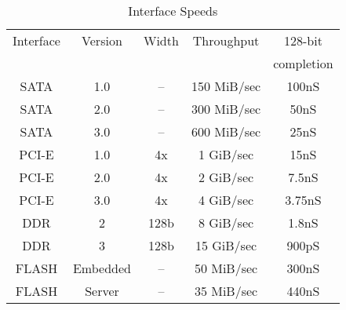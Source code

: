 \documentclass[jounal,letterpaper]{IEEEtran}
\begin{document}
\begin{table}[t]
 \caption{Interface Speeds}
  \label{tab:interfacespeeds}
\centering
\begin{tabular}{|c|c|c|c|c|}
\hline
Interface & Version& Width & Throughput & 128-bit\\
 & & & &completion\\
\hline
SATA &1.0 & -- & 150 MiB/sec &100nS \\
\hline
SATA &2.0 & -- & 300 MiB/sec &50nS\\
\hline
SATA &3.0 & -- & 600 MiB/sec &25nS\\
\hline
PCI-E &1.0 & 4x & 1 GiB/sec & 15nS \\
\hline
PCI-E &2.0 & 4x & 2 GiB/sec & 7.5nS\\
\hline
PCI-E &3.0 & 4x & 4 GiB/sec & 3.75nS\\
\hline
DDR  &2 & 128b & 8 GiB/sec & 1.8nS\\
\hline
DDR  &3 & 128b & 15 GiB/sec & 900pS\\
\hline
FLASH & Embedded & -- & 50 MiB/sec &300nS \\
\hline
FLASH & Server & -- & 35 MiB/sec & 440nS \\
\hline

\end{tabular}
\end{table}
\end{document}

